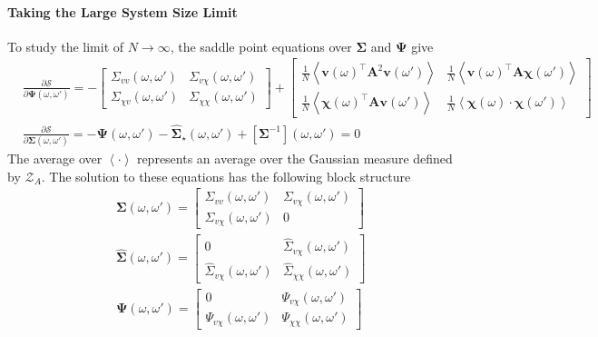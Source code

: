 \documentclass{article} %
\def\v{\bm v}
\begin{document}
\paragraph{Taking the Large System Size Limit} To study the limit of $N \to \infty$, the saddle point equations over $\bm\Sigma$ and $\bm\Psi$ give
\begin{align}
    &\frac{\partial \mathcal S}{\partial \bm\Psi(\omega,\omega') } = 
     - \begin{bmatrix}
        \Sigma_{vv}(\omega, \omega') & \Sigma_{v\chi}(\omega,\omega') 
        \\
        \Sigma_{\chi v}(\omega,\omega') & \Sigma_{\chi\chi}(\omega,\omega')
    \end{bmatrix} + 
    \begin{bmatrix}
        \frac{1}{N} \left< \v(\omega)^\top \bm A^2 \v(\omega') \right> & \frac{1}{N} \left< \v(\omega)^\top \bm A \bm\chi(\omega') \right>
        \\
        \frac{1}{N} \left< \bm\chi(\omega)^\top \bm A \v(\omega') \right> & \frac{1}{N} \left< \bm\chi(\omega) \cdot \bm\chi(\omega') \right>
    \end{bmatrix} \nonumber
    \\
    &\frac{\partial \mathcal S}{\partial \bm\Sigma(\omega,\omega')} = - \bm\Psi(\omega,\omega')  - \bm{\hat\Sigma}_\star(\omega,\omega') + [\bm\Sigma^{-1}](\omega,\omega') = 0
\end{align}
The average over $\left< \cdot \right>$ represents an average over the Gaussian measure defined by $\mathcal Z_A$. The solution to these equations has the following block structure
\begin{align}
    &\bm\Sigma(\omega,\omega') = 
    \begin{bmatrix}
        \Sigma_{vv}(\omega,\omega') &  \Sigma_{v\chi}(\omega,\omega')
        \\
         \Sigma_{v\chi}(\omega,\omega') &  0 
    \end{bmatrix}  
    \\  
    &\hat{\bm\Sigma}(\omega,\omega') = 
    \begin{bmatrix}
        0 & \hat{\Sigma}_{v\chi}(\omega,\omega')
        \\
        \hat{\Sigma}_{v\chi}(\omega,\omega') &  \hat{\Sigma}_{\chi\chi}(\omega,\omega') 
    \end{bmatrix} 
    \\ 
    &\bm\Psi(\omega,\omega') = \begin{bmatrix}
        0 & \Psi_{v\chi}(\omega,\omega')
        \\
        \Psi_{v\chi}(\omega,\omega') &  \Psi_{\chi\chi}(\omega,\omega') 
    \end{bmatrix} 
\end{align}
\end{document}
